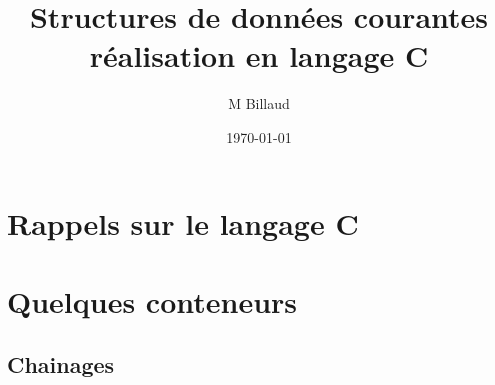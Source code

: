 \documentclass[twoside,openright]{report}
\title{Structures de données courantes \\
       réalisation en langage C}
\author{M Billaud}
\date{\today}
\begin{document}
\maketitle
\tableofcontents


\part{Rappels sur le langage C}




\part{Quelques conteneurs}




\chapter{Chainages}




\end{document}

